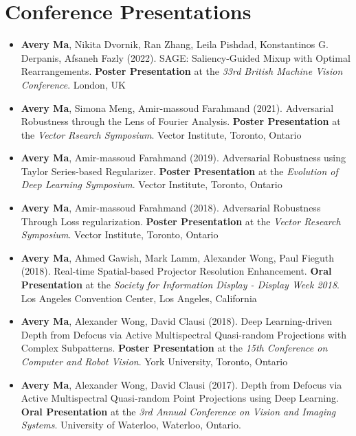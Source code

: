 \section*{Conference Presentations}
\vspace{\postsubhead}
\begin{adjustwidth}{\indentleft}{\indentright}
 \begin{itemize}
    \setlength\itemsep{0.5em}
    
    \item \textbf{Avery Ma}, Nikita Dvornik, Ran Zhang, Leila Pishdad, Konstantinos G. Derpanis, Afsaneh Fazly (2022). SAGE: Saliency-Guided Mixup with Optimal Rearrangements. \textbf{Poster Presentation} at the \emph{33rd British Machine Vision Conference}. London, UK
    
    \item \textbf{Avery Ma}, Simona Meng, Amir-massoud Farahmand (2021). Adversarial Robustness through the Lens of Fourier Analysis. \textbf{Poster Presentation} at the \emph{Vector Rsearch Symposium}. Vector Institute, Toronto, Ontario
    
    \item \textbf{Avery Ma}, Amir-massoud Farahmand (2019). Adversarial Robustness using Taylor Series-based Regularizer. \textbf{Poster Presentation} at the \emph{Evolution of Deep Learning Symposium}. Vector Institute, Toronto, Ontario
    
    \item \textbf{Avery Ma}, Amir-massoud Farahmand (2018). Adversarial Robustness Through Loss regularization. \textbf{Poster Presentation} at the \emph{Vector Research Symposium}. Vector Institute, Toronto, Ontario
    
    \item \textbf{Avery Ma}, Ahmed Gawish, Mark Lamm, Alexander Wong, Paul Fieguth (2018). Real-time Spatial-based Projector Resolution Enhancement. \textbf{Oral Presentation} at the \emph{Society for Information Display - Display Week 2018}. Los Angeles Convention Center, Los Angeles, California
    
    \item \textbf{Avery Ma}, Alexander Wong, David Clausi (2018). Deep Learning-driven Depth from Defocus via Active Multispectral Quasi-random Projections with Complex Subpatterns. \textbf{Poster Presentation} at the \emph{15th Conference on Computer and Robot Vision}. York University, Toronto, Ontario
            
    \item \textbf{Avery Ma}, Alexander Wong, David Clausi (2017). Depth from Defocus via Active Multispectral Quasi-random Point Projections using Deep Learning. \textbf{Oral Presentation} at the \emph{3rd Annual Conference on Vision and Imaging Systems}. University of Waterloo, Waterloo, Ontario.
    

\end{itemize}
\end{adjustwidth}
